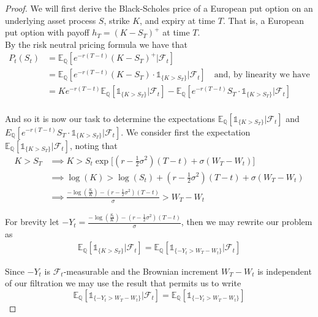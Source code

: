 \documentclass[12pt]{article}
\newlength\tindent
\renewcommand{\indent}{\hspace*{\tindent}}
\begin{document}
\begin{proof} We will first derive the Black-Scholes price of a European put option on an underlying asset process $S$, strike $K$, and expiry at time $T$. That is, a European put option with payoff $h_T = (K - S_T)^+$ at time $T$. \\

By the risk neutral pricing formula we have that
\begin{align*}
	P_t(S_t) &= \mathbb E_{\mathbb Q}[e^{-r(T - t)}(K - S_T)^+| \mathcal F_t] \\
	&= \mathbb E_{\mathbb Q}[e^{-r(T - t)}(K - S_T) \cdot\mathds 1_{\{K > S_T\}}| \mathcal F_t] \quad \text{and, by linearity we have} \\
	&= Ke^{-r(T - t)}\mathbb E_{\mathbb Q}[\mathds 1_{\{K > S_T\}}| \mathcal F_t] -\mathbb E_{\mathbb Q}[ e^{-r(T - t)}S_T \cdot \mathds 1_{\{K > S_T\}}| \mathcal F_t] \\
\end{align*}

\indent And so it is now our task to determine the expectations $\mathbb E_{\mathbb Q}[\mathds 1_{\{K > S_T\}}| \mathcal F_t]$ and $E_{\mathbb Q}[ e^{-r(T - t)} S_T \cdot \mathds 1_{\{K > S_T\}}| \mathcal F_t]$. We consider first the expectation $\mathbb E_{\mathbb Q}[\mathds 1_{\{K > S_T\}}| \mathcal F_t]$, noting that
\begin{align*}
	K > S_T &\implies K > S_t\exp{\big[(r - \frac{1}{2}\sigma^2)(T - t) + \sigma(W_T - W_t)\big]} \\
	&\implies \log(K) > \log(S_t) + (r - \frac{1}{2}\sigma^2)(T - t) + \sigma(W_T - W_t) \\
	&\implies \frac{-\log(\frac{S_t}{K}) - (r - \frac{1}{2}\sigma^2)(T - t)}{\sigma} > W_T - W_t
\end{align*}

For brevity let $-Y_t = \frac{-\log(\frac{S_t}{K}) - (r - \frac{1}{2}\sigma^2)(T - t)}{\sigma}$, then we may rewrite our problem as
\begin{align*}
	\mathbb E_{\mathbb Q}[\mathds 1_{\{K > S_T\}} | \mathcal F_t] = \mathbb E_{\mathbb Q}[\mathds 1_{\{-Y_t > W_T - W_t\}} | \mathcal F_t]
\end{align*}

\indent Since $-Y_t$ is $\mathcal F_t$-measurable and the Brownian increment $W_T - W_t$ is independent of our filtration we may use the result that permits us to write
\begin{equation*}
	\mathbb E_{\mathbb Q}[\mathds 1_{\{-Y_t > W_T - W_t\}} | \mathcal F_t] = \mathbb E_{\mathbb Q}[\mathds 1_{\{-Y_t > W_T - W_t\}}]
\end{equation*}


\end{proof}
\end{document}
